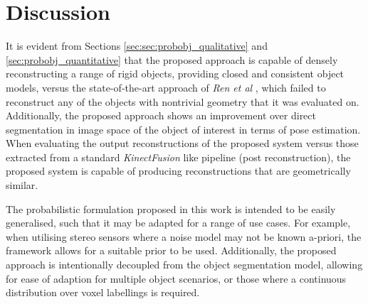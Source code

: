 \section{Discussion}
\label{sec:probobj_discussion}
It is evident from Sections \ref{sec:sec:probobj_qualitative} and \ref{sec:probobj_quantitative} 
that the proposed approach is capable of densely reconstructing a range of rigid objects, providing 
closed and consistent object models, versus the state-of-the-art approach of \textit{Ren et al} 
\cite{Ren2013}, which failed to reconstruct any of the objects with nontrivial geometry that it 
was evaluated on. Additionally, the proposed approach shows an improvement over direct segmentation 
in image space of the object of interest in terms of pose estimation. When evaluating the output 
reconstructions of the proposed system versus those extracted from a standard \textit{KinectFusion} 
like pipeline (post reconstruction), the proposed system is capable of producing reconstructions that 
are geometrically similar.

The probabilistic formulation proposed in this work is intended to be easily generalised, such that 
it may be adapted for a range of use cases. For example, when utilising stereo sensors where a noise 
model may not be known a-priori, the framework allows for a suitable prior to be used. Additionally, 
the proposed approach is intentionally decoupled from the object segmentation model, allowing for 
ease of adaption for multiple object scenarios, or those where a continuous distribution over voxel 
labellings is required.